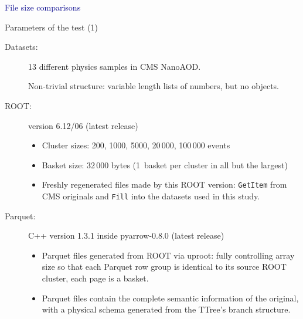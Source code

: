 \documentclass[aspectratio=169]{beamer}
\begin{document}
\begin{frame}{}
\vspace{0.5 cm}
\begin{center}
\Huge \textcolor{darkblue}{File size comparisons}
\end{center}
\end{frame}

\begin{frame}{Parameters of the test (1)}
\vspace{0.35 cm}
\begin{description}
\item[Datasets:] 13 different physics samples in CMS NanoAOD.

\vspace{0.1 cm}
Non-trivial structure: variable length lists of numbers, but no objects.

\vspace{0.2 cm}
\item[ROOT:] version 6.12/06 (latest release)

\begin{itemize}
\item Cluster sizes: 200, 1000, 5000, 20\,000, 100\,000 events
\item Basket size: 32\,000 bytes (1~basket per cluster in all but the largest)
\item Freshly regenerated files made by this ROOT version: {\tt\small GetItem} from CMS originals and {\tt\small Fill} into the datasets used in this study.
\end{itemize}

\item[Parquet:] C++ version 1.3.1 inside pyarrow-0.8.0 (latest release)

\begin{itemize}
\item Parquet files generated from ROOT via uproot: fully controlling array size so that each Parquet row group is identical to its source ROOT cluster, each page is a basket.
\item Parquet files contain the complete semantic information of the original, with a physical schema generated from the TTree's branch structure.
\end{itemize}
\end{description}
\end{frame}
\end{document}
